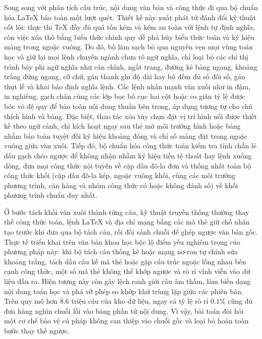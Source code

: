 Song song với phân tích cấu trúc, nội dung văn bản và công thức đi qua bộ chuẩn hóa LaTeX bảo toàn một lượt quét. Thiết kế này xuất phát từ đánh đổi kỹ thuật cốt lõi: thực thi TeX đầy đủ quá tốn kém và kém an toàn với lệnh tự định nghĩa, còn việc xóa thô bằng biểu thức chính quy dễ phá hủy biểu thức toán và ký hiệu mảng trong ngoặc vuông. Do đó, bộ làm sạch bỏ qua nguyên vẹn mọi vùng toán học và giữ lại mọi lệnh chuyên ngành chưa rõ ngữ nghĩa, chỉ loại bỏ các chỉ thị trình bày phi ngữ nghĩa như căn chỉnh, ngắt trang, đường kẻ bảng ngang, khoảng trắng đứng ngang, cỡ chữ, gán thanh ghi độ dài hay bộ đếm đủ số đối số, gán thụt lề và khai báo định nghĩa lệnh. Các lệnh nhấn mạnh văn xuôi như in đậm, in nghiêng, gạch chân cùng các lớp bọc bố cục hai cột hoặc co giãn tỷ lệ được bóc vỏ đệ quy để bảo toàn nội dung thuần bên trong, áp dụng tương tự cho chú thích hình và bảng. Đặc biệt, thao tác xóa tùy chọn đặt vị trí hình nổi được thiết kế theo ngữ cảnh, chỉ kích hoạt ngay sau thẻ mở môi trường hình hoặc bảng nhằm bảo toàn tuyệt đối ký hiệu khoảng đóng và chỉ số mảng đặt trong ngoặc vuông giữa văn xuôi. Tiếp đó, bộ chuẩn hóa công thức toán kiểm tra tính chẵn lẻ dấu gạch chéo ngược để không nhận nhầm ký hiệu tiền tệ thoát hay lệnh xuống dòng, đưa mọi công thức nội tuyến về cặp dấu đô-la đơn và thống nhất toàn bộ công thức khối (cặp dấu đô-la kép, ngoặc vuông khối, cùng các môi trường phương trình, căn hàng và nhóm công thức có hoặc không đánh số) về khối phương trình chuẩn duy nhất.

Ở bước tách khối văn xuôi thành từng câu, kỹ thuật truyền thống thường thay thế công thức toán, lệnh LaTeX và địa chỉ mạng bằng các mã thẻ giữ chỗ nhân tạo trước khi đưa qua bộ tách câu, rồi đối sánh chuỗi để ghép ngược văn bản gốc. Thực tế triển khai trên văn bản khoa học bộc lộ điểm yếu nghiêm trọng của phương pháp này: khi bộ tách câu thống kê hoặc mạng nơ-ron tự chỉnh sửa khoảng trắng, tách dấu câu kề mã thẻ hoặc gặp cấu trúc ngoặc lồng nhau bên cạnh công thức, một số mã thẻ không thể khớp ngược và rò rỉ vĩnh viễn vào dữ liệu đầu ra. Hiện tượng này còn gây lệch ranh giới câu âm thầm, làm biến dạng nội dung toán học và phá vỡ phép so khớp khử trùng lặp giữa các phiên bản. Trên quy mô hơn $8.6$ triệu câu của kho dữ liệu, ngay cả tỷ lệ rò rỉ $0.1\%$ cũng đủ đưa hàng nghìn chuỗi lỗi vào bảng phần tử nội dung. Vì vậy, bài toán đòi hỏi một cơ chế bảo vệ cú pháp không can thiệp vào chuỗi gốc và loại bỏ hoàn toàn bước thay thế ngược.

